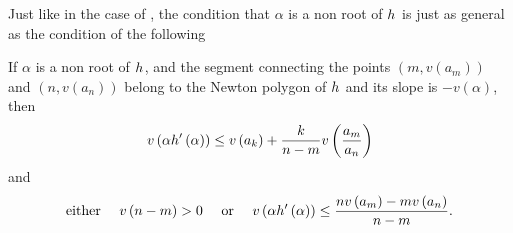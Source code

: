 \documentclass[../main.tex]{subfiles}
\begin{document}
  Just like in the case of , the condition that $\alpha$ is a non \ex root of $h_{}$ is just as general as the condition of the following
  \begin{corollary}
    \label{cor:explicit_non_ex_bound}
    If $\alpha$ is a non \ex root of $h_{}$, and the segment connecting the points $\left( m, v\left( a_m \right) \right)$ and $\left( n, v\left( a_n \right) \right)$ belong to the Newton polygon of $h_{}$ and its slope is $-v\left( \alpha \right)$, then
    \begin{gather}
      v\left( \alpha h_{}'\left( \alpha \right) \right) 
      \leq
      v\left( a_k \right) + \frac{k}{n - m}v\left( \frac{a_m}{a_n} \right)
      \label{item:k_es}
    \end{gather}
    and 
    \begin{gather}
      \text{either }
      \quad
      v\left( n - m \right) 
      >
      0
      \quad
      \text{ or }
      \quad
      v\left( \alpha h_{}'\left( \alpha \right) \right)
      \leq 
      \frac{
        n v\left( a_m \right) - m v\left( a_n \right)
      }{
        n - m
      }.
      \label{item:non_k_es}
    \end{gather}
  \end{corollary}
\end{document}
